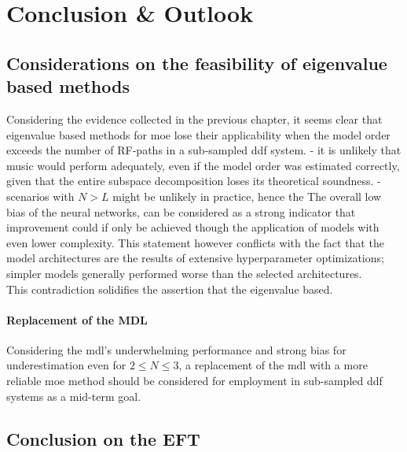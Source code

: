 
\chapter{Conclusion \& Outlook}
\label{ch:conclusion_outlook}

\section{Considerations on the feasibility of eigenvalue based methods}
Considering the evidence collected in the previous chapter, it seems clear that eigenvalue based methods for \gls{moe}
lose their applicability when the model order exceeds the number of RF-paths in a sub-sampled \gls{ddf} system.
- it is unlikely that \gls{music} would perform adequately, even if the model order was estimated correctly, given that
the entire subspace decomposition loses its theoretical soundness.
- scenarios with \( N > L \) might be unlikely in practice, hence the
The overall low bias of the neural networks, can be considered as a strong indicator that improvement could if only be achieved
though the application of models with even lower complexity. This statement however conflicts with the fact that the model
architectures are the results of extensive hyperparameter optimizations; simpler models generally performed worse than
the selected architectures. \\
This contradiction solidifies the assertion that the eigenvalue based.



\subsubsection{Replacement of the MDL}
Considering the \gls{mdl}'s underwhelming performance and strong bias for underestimation even for \( 2 \leq N \leq 3 \),
a replacement of the \gls{mdl} with a more reliable \gls{moe} method should be considered for employment in sub-sampled \gls{ddf}
systems as a mid-term goal. \\





\section{Conclusion on the EFT}

